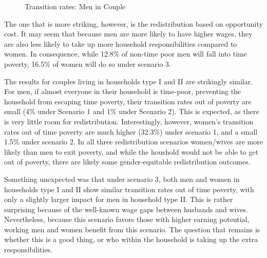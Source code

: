 \documentclass[
  11pt,
]{article}
\begin{document}
\begin{figure}[H]


\caption{\label{fig-transition1}Transition rates: Men in Couple}

\end{figure}%

The one that is more striking, however, is the redistribution based on
opportunity cost. It may seem that because men are more likely to have
higher wages, they are also less likely to take up more household
responsibilities compared to women. In consequence, while 12.8\% of
non-time poor men will fall into time poverty, 16.5\% of women will do
so under scenario 3.

The results for couples living in households type I and II are
strikingly similar. For men, if almost everyone in their household is
time-poor, preventing the household from escaping time poverty, their
transition rates out of poverty are small (4\% under Scenario 1 and 1\%
under Scenario 2). This is expected, as there is very little room for
redistribution. Interestingly, however, women's transition rates out of
time poverty are much higher (32.3\%) under scenario 1, and a small
1.5\% under scenario 2. In all three redistribution scenarios
women/wives are more likely than men to exit poverty, and while the
houshold would not be able to get out of poverty, there are likely some
gender-equitable redistribution outcomes.

Something unexpected was that under scenario 3, both men and women in
households type I and II show similar transition rates out of time
poverty, with only a slightly larger impact for men in household type
II. This is rather surprising because of the well-known wage gaps
between husbands and wives. Nevertheless, because this scenario favors
those with higher earning potential, working men and women benefit from
this scenario. The question that remains is whether this is a good
thing, or who within the household is taking up the extra
responsibilities.
\end{document}
